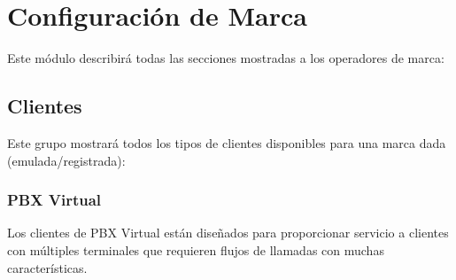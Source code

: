\documentclass[letterpaper,10pt,spanish]{sphinxmanual}
\begin{document}
\chapter{Configuración de Marca}
\label{administration_portal/brand/index::doc}\label{administration_portal/brand/index:brand-configuration}
Este módulo describirá todas las secciones mostradas a los operadores de marca:


\section{Clientes}
\label{administration_portal/brand/clients/index:clients}\label{administration_portal/brand/clients/index::doc}
Este grupo mostrará todos los tipos de clientes disponibles para una marca dada (emulada/registrada):


\subsection{PBX Virtual}
\label{administration_portal/brand/clients/virtual_pbx:id1}\label{administration_portal/brand/clients/virtual_pbx::doc}\label{administration_portal/brand/clients/virtual_pbx:virtual-pbx}
Los clientes de PBX Virtual están diseñados para proporcionar servicio a clientes con múltiples terminales que requieren flujos de llamadas con muchas características.
\end{document}
